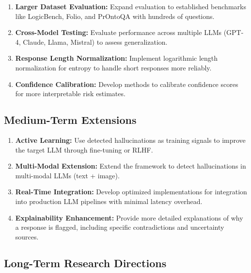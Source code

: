 \begin{enumerate}
    \item \textbf{Larger Dataset Evaluation:} Expand evaluation to established benchmarks like LogicBench, Folio, and PrOntoQA with hundreds of questions.

    \item \textbf{Cross-Model Testing:} Evaluate performance across multiple LLMs (GPT-4, Claude, Llama, Mistral) to assess generalization.

    \item \textbf{Response Length Normalization:} Implement logarithmic length normalization for entropy to handle short responses more reliably.

    \item \textbf{Confidence Calibration:} Develop methods to calibrate confidence scores for more interpretable risk estimates.
\end{enumerate}

\subsection{Medium-Term Extensions}

\begin{enumerate}
    \item \textbf{Active Learning:} Use detected hallucinations as training signals to improve the target LLM through fine-tuning or RLHF.

    \item \textbf{Multi-Modal Extension:} Extend the framework to detect hallucinations in multi-modal LLMs (text + image).

    \item \textbf{Real-Time Integration:} Develop optimized implementations for integration into production LLM pipelines with minimal latency overhead.

    \item \textbf{Explainability Enhancement:} Provide more detailed explanations of why a response is flagged, including specific contradictions and uncertainty sources.
\end{enumerate}

\subsection{Long-Term Research Directions}


